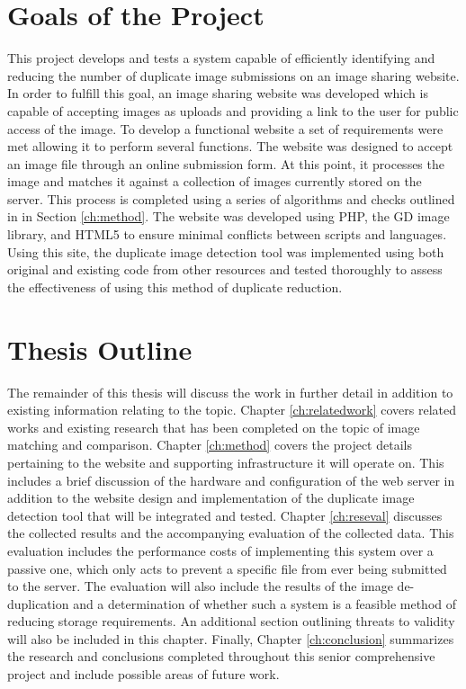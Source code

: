 \section{Goals of the Project}\label{sec:goals}
This project develops and tests a system capable of efficiently identifying and reducing the number of duplicate image submissions on an image sharing website. In order to fulfill this goal, an image sharing website was developed which is capable of accepting images as uploads and providing a link to the user for public access of the image. To develop a functional website a set of requirements were met allowing it to perform several functions. The website was designed to accept an image file through an online submission form. At this point, it processes the image and matches it against a collection of images currently stored on the server. This process is completed using a series of algorithms and checks outlined in in Section \ref{ch:method}. The website was developed using PHP, the GD image library, and HTML5 to ensure minimal conflicts between scripts and languages. Using this site, the duplicate image detection tool was implemented using both original and existing code from other resources and tested thoroughly to assess the effectiveness of using this method of duplicate reduction.

\section{Thesis Outline}\label{sec:outline}
The remainder of this thesis will discuss the work in further detail in addition to existing information relating to the topic. Chapter \ref{ch:relatedwork} covers related works and existing research that has been completed on the topic of image matching and comparison. Chapter \ref{ch:method} covers the project details pertaining to the website and supporting infrastructure it will operate on. This includes a brief discussion of the hardware and configuration of the web server in addition to the website design and implementation of the duplicate image detection tool that will be integrated and tested. Chapter \ref{ch:reseval} discusses the collected results and the accompanying evaluation of the collected data. This evaluation includes the performance costs of implementing this system over a passive one, which only acts to prevent a specific file from ever being submitted to the server. The evaluation will also include the results of the image de-duplication and a determination of whether such a system is a feasible method of reducing storage requirements. An additional section outlining threats to validity will also be included in this chapter. Finally, Chapter \ref{ch:conclusion} summarizes the research and conclusions completed throughout this senior comprehensive project and include possible areas of future work.